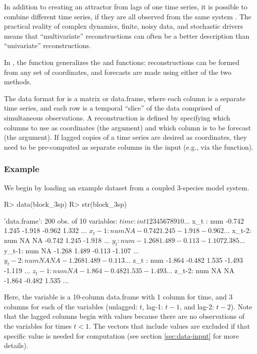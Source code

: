 \documentclass[article]{jss}
\begin{document}
In addition to creating an attractor from lags of one time series, it is possible to combine different time series, if they are all observed from the same system \citep{Sauer_1991, Deyle_2011}. The practical reality of complex dynamics, finite, noisy data, and stochastic drivers means that ``multivariate'' reconstructions can often be a better description than ``univariate'' reconstructions.

In , the  function generalizes the  and  functions: reconstructions can be formed from any set of coordinates, and forecasts are made using either of the two methods.

The data format for  is a matrix or data.frame, where each column is a separate time series, and each row is a temporal ``slice'' of the data comprised of simultaneous observations. A reconstruction is defined by specifying which columns to use as coordinates (the  argument) and which column is to be forecast (the  argument). If lagged copies of a time series are desired as coordinates, they need to be pre-computed as separate columns in the input (e.g., via the  function).

\subsubsection{Example}\label{sec:block-lnlp-example}

We begin by loading an example dataset from a coupled 3-species model system.

\begin{Schunk}
\begin{Sinput}
R> data(block_3sp)
R> str(block_3sp)
\end{Sinput}
\begin{Soutput}
'data.frame':	200 obs. of  10 variables:
 $ time : int  1 2 3 4 5 6 7 8 9 10 ...
 $ x_t  : num  -0.742 1.245 -1.918 -0.962 1.332 ...
 $ x_t-1: num  NA -0.742 1.245 -1.918 -0.962 ...
 $ x_t-2: num  NA NA -0.742 1.245 -1.918 ...
 $ y_t  : num  -1.268 1.489 -0.113 -1.107 2.385 ...
 $ y_t-1: num  NA -1.268 1.489 -0.113 -1.107 ...
 $ y_t-2: num  NA NA -1.268 1.489 -0.113 ...
 $ z_t  : num  -1.864 -0.482 1.535 -1.493 -1.119 ...
 $ z_t-1: num  NA -1.864 -0.482 1.535 -1.493 ...
 $ z_t-2: num  NA NA -1.864 -0.482 1.535 ...
\end{Soutput}
\end{Schunk}

Here, the  variable is a 10-column data.frame with 1 column for time, and 3 columns for each of the variables (unlagged: $t$, lag-1: $t-1$, and lag-2: $t-2$). Note that the lagged columns begin with  values because there are no observations of the variables for times $t < 1$. The vectors that include  values are excluded if that specific value is needed for computation (see section \ref{sec:data-input} for more details).
\end{document}
